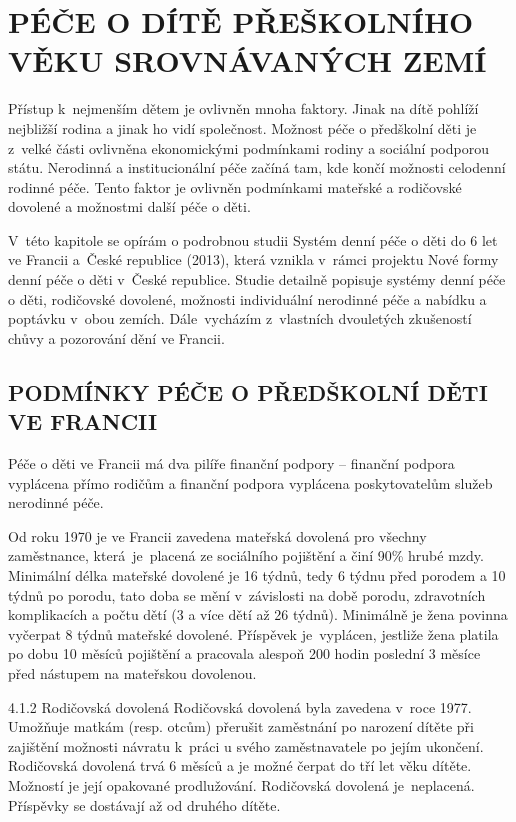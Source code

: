 \chapter{PÉČE O DÍTĚ PŘEŠKOLNÍHO VĚKU SROVNÁVANÝCH ZEMÍ}

	Přístup k nejmenším dětem je ovlivněn mnoha faktory. Jinak na dítě pohlíží nejbližší rodina a jinak ho vidí společnost. Možnost péče o předškolní děti je z velké části ovlivněna ekonomickými podmínkami rodiny a sociální podporou státu. Nerodinná a institucionální péče začíná tam, kde končí možnosti celodenní rodinné péče. Tento faktor je ovlivněn podmínkami mateřské a rodičovské dovolené a možnostmi další péče o děti.

	V této kapitole se opírám o podrobnou studii Systém denní péče o děti do 6 let ve Francii a České republice (2013), která vznikla v rámci projektu Nové formy denní péče o děti v České republice. Studie detailně popisuje systémy denní péče o děti, rodičovské dovolené, možnosti individuální nerodinné péče a nabídku a poptávku v obou zemích. Dále vycházím z vlastních dvouletých zkušeností chůvy a pozorování dění ve Francii.

		\section{PODMÍNKY PÉČE O PŘEDŠKOLNÍ DĚTI VE FRANCII}
		Péče o děti ve Francii má dva pilíře finanční podpory – finanční podpora vyplácena přímo rodičům a finanční podpora vyplácena poskytovatelům služeb nerodinné péče. 

			Od roku 1970 je ve Francii zavedena mateřská dovolená pro všechny zaměstnance, která je placená ze sociálního pojištění a činí 90\% hrubé mzdy. Minimální délka mateřské dovolené je 16 týdnů, tedy 6 týdnu před porodem a 10 týdnů po porodu, tato doba se mění v závislosti na době porodu, zdravotních komplikacích a počtu dětí (3 a více dětí až 26 týdnů). Minimálně je žena povinna vyčerpat 8 týdnů mateřské dovolené. Příspěvek je vyplácen, jestliže žena platila po dobu 10 měsíců pojištění a pracovala alespoň 200 hodin poslední 3 měsíce před nástupem na mateřskou dovolenou.

4.1.2 Rodičovská dovolená
Rodičovská dovolená byla zavedena v roce 1977. Umožňuje matkám (resp. otcům) přerušit zaměstnání po narození dítěte při zajištění možnosti návratu k práci u svého zaměstnavatele po jejím ukončení. Rodičovská dovolená trvá 6 měsíců a je možné čerpat do tří let věku dítěte. Možností je její opakované prodlužování. Rodičovská dovolená je neplacená. Příspěvky se dostávají až od druhého dítěte. 

